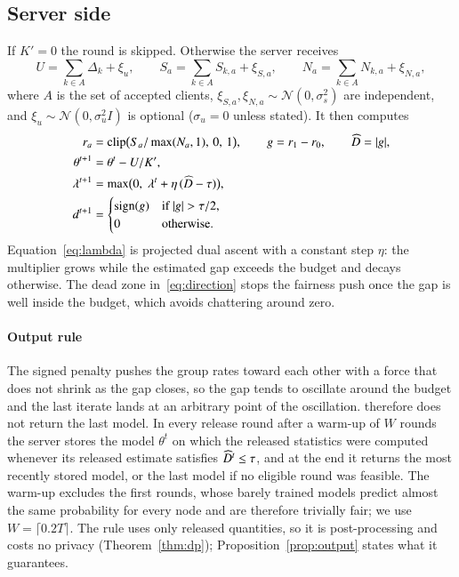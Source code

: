 \subsection{Server side}
If $K'=0$ the round is skipped. Otherwise the server receives
\begin{equation}\label{eq:sums}
U=\sum_{k\in A}\Delta_k+\xi_u,\qquad S_a=\sum_{k\in A}S_{k,a}+\xi_{S,a},\qquad N_a=\sum_{k\in A}N_{k,a}+\xi_{N,a},
\end{equation}
where $A$ is the set of accepted clients, $\xi_{S,a},\xi_{N,a}\sim\mathcal{N}(0,\sigma_s^2)$ are independent, and $\xi_u\sim\mathcal{N}(0,\sigma_u^2I)$ is optional ($\sigma_u=0$ unless stated). It then computes
\begin{align}
r_a&=\mathrm{clip}\bigl(S_a/\max(N_a,1),\,0,\,1\bigr),\qquad g=r_1-r_0,\qquad \Dhat=|g|,\label{eq:rates}\\
\theta^{t+1}&=\theta^t-U/K',\label{eq:theta}\\
\lambda^{t+1}&=\max\bigl(0,\;\lambda^t+\eta\,(\Dhat-\tau)\bigr),\label{eq:lambda}\\
d^{t+1}&=\begin{cases}\mathrm{sign}(g)&\text{if }|g|>\tau/2,\\0&\text{otherwise.}\end{cases}\label{eq:direction}
\end{align}
Equation~\eqref{eq:lambda} is projected dual ascent with a constant step $\eta$: the multiplier grows while the estimated gap exceeds the budget and decays otherwise. The dead zone in~\eqref{eq:direction} stops the fairness push once the gap is well inside the budget, which avoids chattering around zero.

\paragraph{Output rule}
The signed penalty pushes the group rates toward each other with a force that does not shrink as the gap closes, so the gap tends to oscillate around the budget and the last iterate lands at an arbitrary point of the oscillation. \clamp{} therefore does not return the last model. In every release round after a warm-up of $W$ rounds the server stores the model $\theta^t$ on which the released statistics were computed whenever its released estimate satisfies $\widehat{D}^t\le\tau$, and at the end it returns the most recently stored model, or the last model if no eligible round was feasible. The warm-up excludes the first rounds, whose barely trained models predict almost the same probability for every node and are therefore trivially fair; we use $W=\lceil0.2T\rceil$. The rule uses only released quantities, so it is post-processing and costs no privacy (Theorem~\ref{thm:dp}); Proposition~\ref{prop:output} states what it guarantees.

